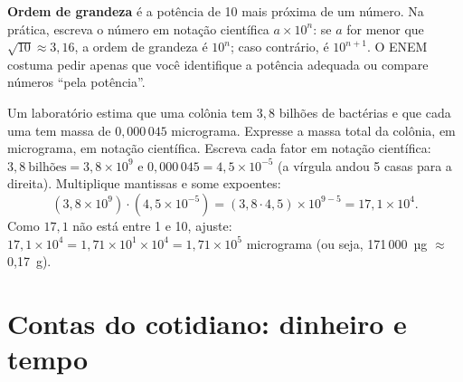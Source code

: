 \begin{center}
\end{center}

\textbf{Ordem de grandeza} é a potência de 10 mais próxima de um número. Na prática, escreva o
número em notação científica $a\times 10^n$: se $a$ for menor que $\sqrt{10}\approx 3,16$, a ordem de
grandeza é $10^n$; caso contrário, é $10^{n+1}$. O ENEM costuma pedir apenas que você identifique
a potência adequada ou compare números ``pela potência''.

\begin{exemplo}
Um laboratório estima que uma colônia tem $3,8$ bilhões de bactérias e que cada uma tem massa de
$0,000\,045$ micrograma. Expresse a massa total da colônia, em micrograma, em notação científica.
\solucao
Escreva cada fator em notação científica: $3,8\ \text{bilhões}=3,8\times 10^{9}$ e
$0,000\,045=4,5\times 10^{-5}$ (a vírgula andou 5 casas para a direita). Multiplique mantissas e
some expoentes:
\[(3,8\times 10^{9})\cdot(4,5\times 10^{-5})=(3,8\cdot 4,5)\times 10^{9-5}=17,1\times 10^{4}.\]
Como $17,1$ não está entre 1 e 10, ajuste: $17,1\times 10^4=1,71\times 10^{1}\times 10^{4}=1,71\times 10^{5}$
micrograma (ou seja, 171\,000~µg $\approx$ 0,17~g).
\end{exemplo}

\section{Contas do cotidiano: dinheiro e tempo}


